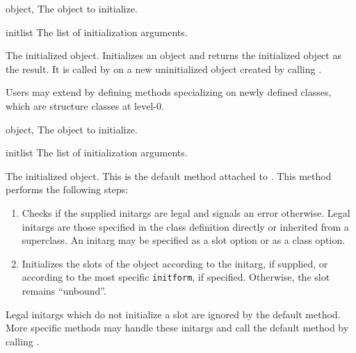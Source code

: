 \begin{optDefinition}
%
\begin{genericargs}
    \item[object, \classref{object}] The object to initialize.
    \item[initlist] The list of initialization arguments.
\end{genericargs}
%
\result%
The initialized object.
%
\remarks%
Initializes an object and returns the initialized object as the result.  It is
called by  on a new uninitialized object created by calling
.

Users may extend  by defining methods specializing on
newly defined classes, which are structure classes at level-0.

%
\begin{specargs}
    \item[object, \classref{object}] The object to initialize.
    \item[initlist] The list of initialization arguments.
\end{specargs}
%
\result%
The initialized object.
%
\remarks%
This is the default method attached to .  This method
performs the following steps:

\begin{enumerate}
    \item Checks if the supplied initargs are legal and signals an error
    otherwise. Legal initargs are those specified in the class definition
    directly or inherited from a superclass.  An initarg may be specified as a
    slot option or as a class option.

    \item Initializes the slots of the object according to the initarg, if
    supplied, or according to the most specific {\tt initform}, if specified.
    Otherwise, the slot remains ``unbound''.
\end{enumerate}
%
Legal initargs which do not initialize a slot are ignored by the default
 method.  More specific methods may handle these initargs
and call the default method by calling .
%
%
\end{optDefinition}

